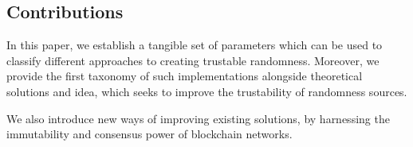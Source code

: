 \subsection*{Contributions}\label{subsec:contributions}
In this paper, we establish a tangible set of parameters which can be used to classify different approaches to creating trustable randomness.
Moreover, we provide the first taxonomy of such implementations alongside theoretical solutions and idea, which seeks to improve the trustability of randomness sources.

We also introduce new ways of improving existing solutions, by harnessing the immutability and consensus power of blockchain networks.







